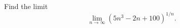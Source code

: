 \begin{exercise}
  \label{ex:hw04:polynomial-root-limit}
  Find the limit
  \[
    \lim_{n\to\infty}(5n^3-2n+100)^{1/n}.
  \]
\end{exercise}
